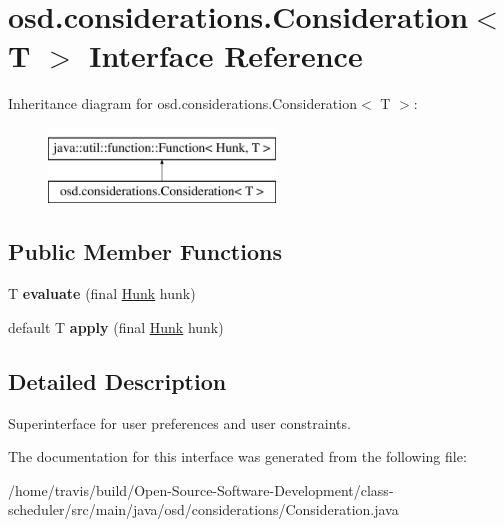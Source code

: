 \hypertarget{interfaceosd_1_1considerations_1_1_consideration_3_01_t_01_4}{\section{osd.\-considerations.\-Consideration$<$ T $>$ Interface Reference}
\label{interfaceosd_1_1considerations_1_1_consideration_3_01_t_01_4}
}
Inheritance diagram for osd.\-considerations.\-Consideration$<$ T $>$\-:\begin{figure}[H]
\begin{center}
\leavevmode
\includegraphics[height=2.000000cm]{interfaceosd_1_1considerations_1_1_consideration_3_01_t_01_4}
\end{center}
\end{figure}
\subsection*{Public Member Functions}
\begin{DoxyCompactItemize}
\item 
\hypertarget{interfaceosd_1_1considerations_1_1_consideration_3_01_t_01_4_a89b752c3950fb30f7a98d412bb413094}{T {\bfseries evaluate} (final \hyperlink{classosd_1_1output_1_1_hunk}{Hunk} hunk)}\label{interfaceosd_1_1considerations_1_1_consideration_3_01_t_01_4_a89b752c3950fb30f7a98d412bb413094}

\item 
\hypertarget{interfaceosd_1_1considerations_1_1_consideration_3_01_t_01_4_a2f414e91c45335e5284c5aa7fd064c41}{default T {\bfseries apply} (final \hyperlink{classosd_1_1output_1_1_hunk}{Hunk} hunk)}\label{interfaceosd_1_1considerations_1_1_consideration_3_01_t_01_4_a2f414e91c45335e5284c5aa7fd064c41}

\end{DoxyCompactItemize}


\subsection{Detailed Description}
Superinterface for user preferences and user constraints. 

The documentation for this interface was generated from the following file\-:\begin{DoxyCompactItemize}
\item 
/home/travis/build/\-Open-\/\-Source-\/\-Software-\/\-Development/class-\/scheduler/src/main/java/osd/considerations/Consideration.\-java\end{DoxyCompactItemize}
